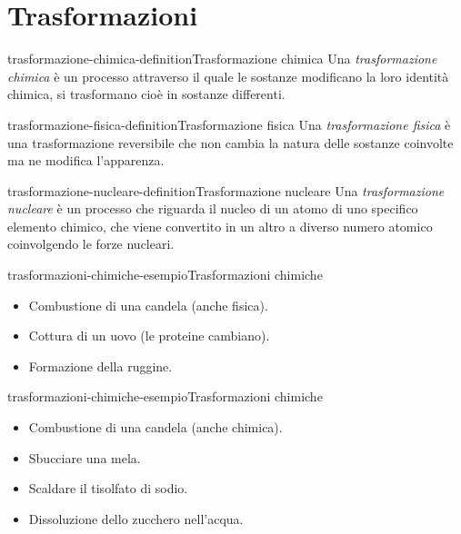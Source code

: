 \documentclass[preview]{standalone}
\begin{document}
\genpage

\section{Trasformazioni}


\begin{snippetdefinition}{trasformazione-chimica-definition}{Trasformazione chimica}
    Una \textit{trasformazione chimica}
    è un processo attraverso il quale le sostanze modificano la loro identità chimica,
    si trasformano cioè in sostanze differenti.
\end{snippetdefinition}

\begin{snippetdefinition}{trasformazione-fisica-definition}{Trasformazione fisica}
    Una \textit{trasformazione fisica} è una trasformazione reversibile
    che non cambia la natura delle sostanze coinvolte ma ne modifica l'apparenza.
\end{snippetdefinition}

\begin{snippetdefinition}{trasformazione-nucleare-definition}{Trasformazione nucleare}
    Una \textit{trasformazione nucleare}
    è un processo che riguarda il nucleo di un atomo di uno specifico elemento chimico,
    che viene convertito in un altro a diverso numero atomico coinvolgendo le forze nucleari.
\end{snippetdefinition}

\begin{snippetexample}{trasformazioni-chimiche-esempio}{Trasformazioni chimiche}
    \begin{itemize}
        \item Combustione di una candela (anche fisica).
        \item Cottura di un uovo (le proteine cambiano).
        \item Formazione della ruggine.
    \end{itemize}
\end{snippetexample}

\begin{snippetexample}{trasformazioni-chimiche-esempio}{Trasformazioni chimiche}
    \begin{itemize}
        \item Combustione di una candela (anche chimica).
        \item Sbucciare una mela.
        \item Scaldare il tisolfato di sodio.
        \item Dissoluzione dello zucchero nell'acqua.
    \end{itemize}
\end{snippetexample}
\end{document}
